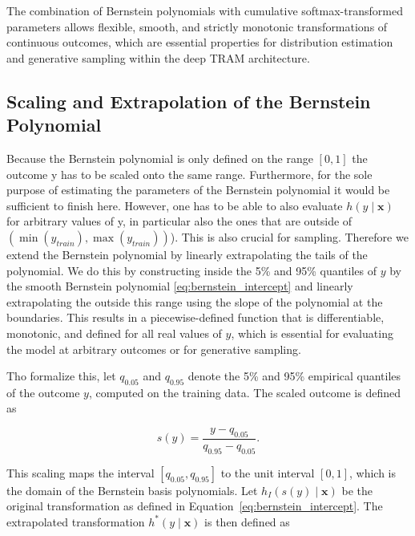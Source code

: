 The combination of Bernstein polynomials with cumulative softmax-transformed parameters allows flexible, smooth, and strictly monotonic transformations of continuous outcomes, which are essential properties for distribution estimation and generative sampling within the deep TRAM architecture.

\subsection{Scaling and Extrapolation of the Bernstein Polynomial}




Because the Bernstein polynomial is only defined on the range \( [0, 1] \) the outcome y has to be scaled onto the same range. Furthermore, for the sole purpose of estimating the parameters of the Bernstein polynomial it would be sufficient to finish here. However, one has to be able to also evaluate $h(y \mid \mathbf{x})$ for arbitrary values of y, in particular also the ones that are outside of $(\min(y_{train}), \max(y_{train}))$). This is also crucial for sampling. Therefore we extend the Bernstein polynomial by linearly extrapolating the tails of the polynomial. We do this by constructing inside the 5\% and 95\% quantiles of $y$ by the smooth Bernstein polynomial \ref{eq:bernstein_intercept} and linearly extrapolating the outside this range using the slope of the polynomial at the boundaries. This results in a piecewise-defined function that is differentiable, monotonic, and defined for all real values of \( y \), which is essential for evaluating the model at arbitrary outcomes or for generative sampling.

Tho formalize this, let \( q_{0.05} \) and \( q_{0.95} \) denote the 5\% and 95\% empirical quantiles of the outcome \( y \), computed on the training data. The scaled outcome is defined as

\begin{equation}
s(y) = \frac{y - q_{0.05}}{q_{0.95} - q_{0.05}}.
\end{equation}

This scaling maps the interval \( [q_{0.05}, q_{0.95}] \) to the unit interval \( [0, 1] \), which is the domain of the Bernstein basis polynomials. Let \( h_I(s(y) \mid \mathbf{x}) \) be the original transformation as defined in Equation~\eqref{eq:bernstein_intercept}. The extrapolated transformation \( h^*(y \mid \mathbf{x}) \) is then defined as


